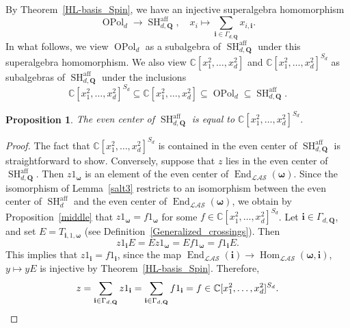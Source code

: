 \documentclass[11pt]{amsart}
\newtheorem{prop}[theo]{Proposition}
\theoremstyle{definition}
\numberwithin{equation}{section}
\begin{document}
By Theorem~\ref{HL-basis_Spin}, we have an injective superalgebra homomorphism
\begin{equation} \label{lifeguard1890}
\operatorname{OPol}_{d} \rightarrow 
\operatorname{SH}^{\operatorname{aff}}_{d,\mathbf{Q}}, \quad x_{i} \mapsto \sum_{\mathbf{i} \in \Gamma_{d,\mathbf{Q}}} x_{i,\mathbf{i}}.
\end{equation}
In what follows, we view $ \operatorname{OPol}_{d} $ as a subalgebra of $ \operatorname{SH}^{\operatorname{aff}}_{d,\mathbf{Q}} $ under this superalgebra homomorphism. We also view $ \mathbb{C}[x_{1}^{2},\ldots,x_{d}^{2}] $ and $ \mathbb{C}[x_{1}^{2},\ldots,x_{d}^{2}]^{S_{d}} $ as subalgebras of $ \operatorname{SH}^{\operatorname{aff}}_{d,\mathbf{Q}} $ under the inclusions 
\begin{equation*}
\mathbb{C}[x_{1}^{2},\ldots,x_{d}^{2}]^{S_{d}} \subseteq \mathbb{C}[x_{1}^{2},\ldots,x_{d}^{2}] \subseteq \operatorname{OPol}_{d} \subseteq \operatorname{SH}^{\operatorname{aff}}_{d,\mathbf{Q}}.
\end{equation*}


\begin{prop} \label{Higher_Spin_center}
The even center of $ \operatorname{SH}^{\operatorname{aff}}_{d,\mathbf{Q}} $ is equal to $ \mathbb{C}[x_{1}^{2},\ldots,x_{d}^{2}]^{S_{d}} $.
\end{prop}

\begin{proof}
The fact that $ \mathbb{C}[x_{1}^{2},\ldots,x_{d}^{2}]^{S_{d}} $ is contained in the even center of $ \operatorname{SH}^{\operatorname{aff}}_{d,\mathbf{Q}} $ is straightforward to show. Conversely, suppose that \(z\) lies in the even center of $ \operatorname{SH}^{\operatorname{aff}}_{d,\mathbf{Q}} $. Then $ z1_{\boldsymbol{\omega}} $ is an element of the even center of $ \operatorname{End}_{\mathcal{LAS}}(\boldsymbol{\omega}) $. Since the isomorphism of Lemma~\ref{salt3} restricts to an isomorphism between the even center of $ \operatorname{SH}^{\operatorname{aff}}_{d} $ and the even center of $ \operatorname{End}_{\mathcal{LAS}}(\boldsymbol{\omega}) $, we obtain by Proposition~\ref{middle} that $ z1_{\boldsymbol{\omega}} = f1_{\boldsymbol{\omega}} $ for some $ f \in \mathbb{C}[x_{1}^{2},\ldots,x_{d}^{2}]^{S_{d}} $. Let $ \mathbf{i} \in \Gamma_{d,\mathbf{Q}} $, and set $ E = T_{\mathbf{i},1,\boldsymbol{\omega}} $ (see Definition~\ref{Generalized_crossings}). Then 
\begin{equation*}
z1_{\mathbf{i}}E = Ez1_{\boldsymbol{\omega}} = Ef1_{\boldsymbol{\omega}} = f1_{\mathbf{i}}E.
\end{equation*}
This implies that $ z1_{\mathbf{i}} = f1_{\mathbf{i}} $, since the map $ \operatorname{End}_{\mathcal{LAS}}(\mathbf{i}) \rightarrow \operatorname{Hom}_{\mathcal{LAS}}(\boldsymbol{\omega},\mathbf{i}) $, $ y \mapsto yE $ is injective by Theorem~\ref{HL-basis_Spin}. Therefore,
\begin{equation*}
z = \sum_{\mathbf{i} \in \Gamma_{d,\mathbf{Q}}} z1_{\mathbf{i}} = \sum_{\mathbf{i} \in \Gamma_{d,\mathbf{Q}}} f1_{\mathbf{i}} = f \in \mathbb{C}[x_{1}^{2},\ldots,x_{d}^{2}]^{S_{d}}. \qedhere
\end{equation*}
\end{proof}
\end{document}
